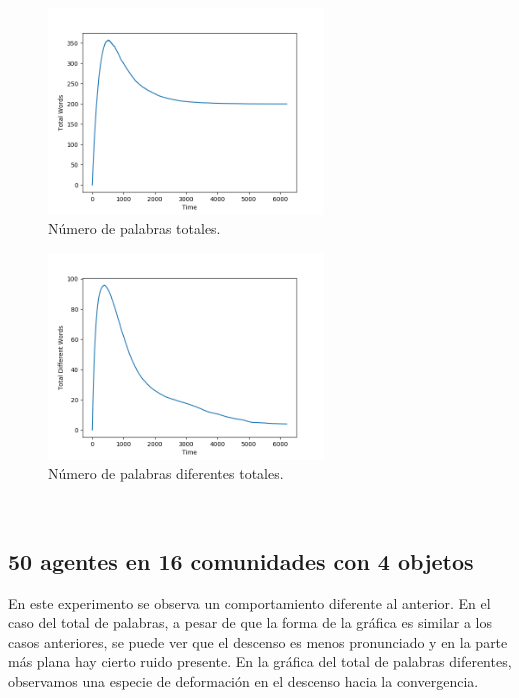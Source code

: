 \documentclass[runningheads]{llncs}
\begin{document}
\begin{figure}[H]
	\centering
	\includegraphics[width=0.65\textwidth]{Figure_111_TotalWords.png}
	\caption{Número de palabras totales.}
	\label{fig_000}
\end{figure}
\begin{figure}[H]
	\centering
	\includegraphics[width=0.65\textwidth]{Figure_111_TotalDifferentWords.png}
	\caption{Número de palabras diferentes totales.}
	\label{fig_001}
\end{figure}
\pagebreak
\\
\subsection{50 agentes en 16 comunidades con 4 objetos}

En este experimento se observa un comportamiento diferente al anterior. En el caso del total de palabras, a pesar de que la forma de la gráfica es similar a los casos anteriores, se puede ver que el descenso es menos pronunciado y en la parte más plana hay cierto ruido presente. En la gráfica del total de palabras diferentes, observamos una especie de deformación en el descenso hacia la convergencia. 
\end{document}
